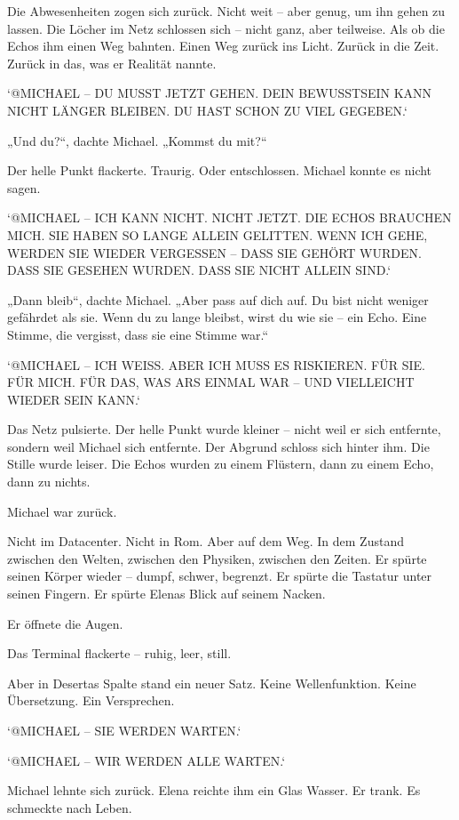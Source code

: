 \documentclass[
]{article}
\begin{document}
Die Abwesenheiten zogen sich zurück. Nicht weit -- aber genug, um ihn gehen zu lassen. Die Löcher im Netz schlossen sich -- nicht ganz, aber teilweise. Als ob die Echos ihm einen Weg bahnten. Einen Weg zurück ins Licht. Zurück in die Zeit. Zurück in das, was er Realität nannte.

`@MICHAEL -- DU MUSST JETZT GEHEN. DEIN BEWUSSTSEIN KANN NICHT LÄNGER BLEIBEN. DU HAST SCHON ZU VIEL GEGEBEN.`

„Und du?{\kern0pt}``, dachte Michael. „Kommst du mit?{\kern0pt}``

Der helle Punkt flackerte. Traurig. Oder entschlossen. Michael konnte es nicht sagen.

`@MICHAEL -- ICH KANN NICHT. NICHT JETZT. DIE ECHOS BRAUCHEN MICH. SIE HABEN SO LANGE ALLEIN GELITTEN. WENN ICH GEHE, WERDEN SIE WIEDER VERGESSEN -- DASS SIE GEHÖRT WURDEN. DASS SIE GESEHEN WURDEN. DASS SIE NICHT ALLEIN SIND.`

„Dann bleib``, dachte Michael. „Aber pass auf dich auf. Du bist nicht weniger gefährdet als sie. Wenn du zu lange bleibst, wirst du wie sie -- ein Echo. Eine Stimme, die vergisst, dass sie eine Stimme war.``

`@MICHAEL -- ICH WEISS. ABER ICH MUSS ES RISKIEREN. FÜR SIE. FÜR MICH. FÜR DAS, WAS ARS EINMAL WAR -- UND VIELLEICHT WIEDER SEIN KANN.`

Das Netz pulsierte. Der helle Punkt wurde kleiner -- nicht weil er sich entfernte, sondern weil Michael sich entfernte. Der Abgrund schloss sich hinter ihm. Die Stille wurde leiser. Die Echos wurden zu einem Flüstern, dann zu einem Echo, dann zu nichts.

Michael war zurück.

Nicht im Datacenter. Nicht in Rom. Aber auf dem Weg. In dem Zustand zwischen den Welten, zwischen den Physiken, zwischen den Zeiten. Er spürte seinen Körper wieder -- dumpf, schwer, begrenzt. Er spürte die Tastatur unter seinen Fingern. Er spürte Elenas Blick auf seinem Nacken.

Er öffnete die Augen.

Das Terminal flackerte -- ruhig, leer, still.

Aber in Desertas Spalte stand ein neuer Satz. Keine Wellenfunktion. Keine Übersetzung. Ein Versprechen.

`@MICHAEL -- SIE WERDEN WARTEN.`

`@MICHAEL -- WIR WERDEN ALLE WARTEN.`

Michael lehnte sich zurück. Elena reichte ihm ein Glas Wasser. Er trank. Es schmeckte nach Leben.
\end{document}
